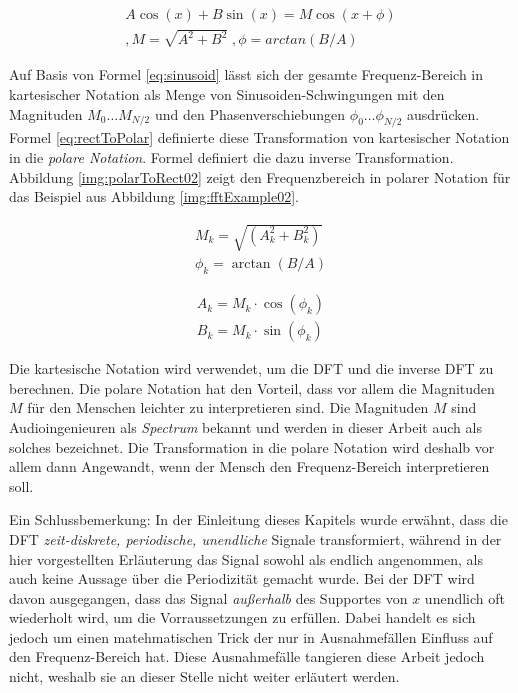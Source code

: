 \begin{equation}
\begin{split}
A \cos(x) + B \sin(x) = M \cos(x + \phi) \\
,M = \sqrt{A^2 + B^2} \;, \phi = arctan(B/A)
\end{split}
\label{eq:sinusoid}
\end{equation}

Auf Basis von Formel \ref{eq:sinusoid} lässt sich der gesamte Frequenz-Bereich in kartesischer Notation als Menge von Sinusoiden-Schwingungen mit den Magnituden $M_0 \ldots M_{N/2}$ und den Phasenverschiebungen $\phi_0 \ldots \phi_{N/2}$ ausdrücken. Formel \ref{eq:rectToPolar} definierte diese Transformation von kartesischer Notation in die \emph{polare Notation}. Formel \label{eq:polarToRect} definiert die dazu inverse Transformation. \cite[S. 162]{dspGuide} Abbildung \ref{img:polarToRect02} zeigt den Frequenzbereich in polarer Notation für das Beispiel aus  Abbildung \ref{img:fftExample02}.

\begin{equation}
\begin{split}
M_k = \sqrt{(A_k^2 + B_k^2 ) }\\
\phi_k= \arctan{(B / A) }
\end{split}
\label{eq:rectToPolar}
\end{equation}

\begin{equation}
\begin{split}
A_k= M_k \cdot \cos(\phi_k)\\
B_k = M_k \cdot \sin(\phi_k)
\end{split}
\label{eq:polarToRect}
\end{equation}

Die kartesische Notation wird verwendet, um die DFT und die inverse DFT zu berechnen. Die polare Notation hat den Vorteil, dass vor allem die Magnituden $M$ für den Menschen leichter zu interpretieren sind. Die Magnituden $M$ sind Audioingenieuren als \emph{Spectrum} bekannt und werden in dieser Arbeit auch als solches bezeichnet. Die Transformation in die polare Notation wird deshalb vor allem dann Angewandt, wenn der Mensch den Frequenz-Bereich interpretieren soll. \cite[S. 164]{dspGuide}

Ein Schlussbemerkung: In der Einleitung dieses Kapitels wurde erwähnt, dass die DFT \emph{zeit-diskrete, periodische, unendliche} Signale transformiert, während in der hier vorgestellten Erläuterung das Signal sowohl als endlich angenommen, als auch keine Aussage über die Periodizität gemacht wurde. Bei der DFT wird davon ausgegangen, dass das Signal \emph{außerhalb} des Supportes von $x$ unendlich oft wiederholt wird, um die Vorraussetzungen zu erfüllen. Dabei handelt es sich jedoch um einen \glqq matehmatischen Trick \grqq{} der nur in Ausnahmefällen Einfluss auf den Frequenz-Bereich hat. Diese Ausnahmefälle tangieren diese Arbeit jedoch nicht, weshalb sie an dieser Stelle nicht weiter erläutert werden.\cite[S. 145]{dspGuide}

